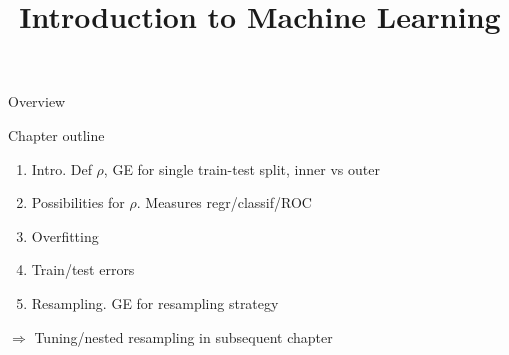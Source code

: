 \documentclass[11pt,compress,t,notes=noshow, xcolor=table]{beamer}
\title{Introduction to Machine Learning}
\institute{\href{https://compstat-lmu.github.io/lecture_i2ml/}{compstat-lmu.github.io/lecture\_i2ml}}
\date{}
\begin{document}








\begin{vbframe}{Overview}

Chapter outline
\begin{enumerate}
  \item Intro. Def $\rho$, GE for single train-test split, inner vs outer
  \item Possibilities for $\rho$. Measures regr/classif/ROC
  \item Overfitting
  \item Train/test errors
  \item Resampling. GE for resampling strategy
\end{enumerate}
$\Rightarrow$ Tuning/nested resampling in subsequent chapter

\end{vbframe}

\end{document}
